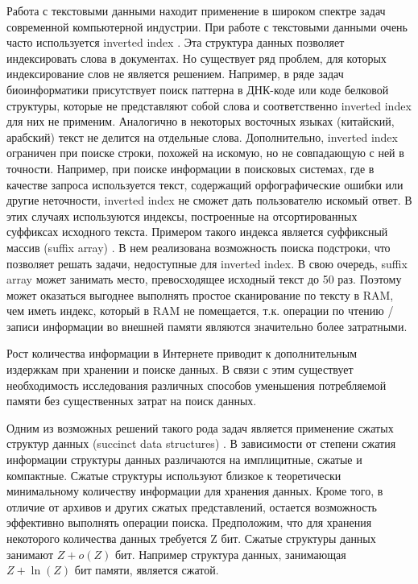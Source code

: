 

Работа с текстовыми данными находит применение в широком спектре задач современной компьютерной индустрии.
При работе с текстовыми данными очень часто используется inverted index \cite{zobel2006inverted}. Эта структура данных
позволяет индексировать слова в документах. Но существует ряд проблем, для которых индексирование слов
не является решением.
Например, в ряде задач биоинформатики \cite{tsuruoka2008facta} присутствует поиск паттерна
в ДНК-коде или коде белковой структуры,
которые не представляют собой слова и соответственно inverted index для них не применим.
Аналогично в некоторых восточных языках (китайский, арабский) текст не делится на отдельные слова.
Дополнительно, inverted index ограничен при поиске строки, похожей на искомую, но не совпадающую с ней в точности.
Например, при поиске информации в поисковых системах, где в качестве запроса используется текст, содержащий
орфографические ошибки или другие неточности, inverted index не сможет дать пользователю искомый ответ.
В этих случаях используются индексы, построенные на отсортированных суффиксах исходного текста.
Примером такого индекса является суффиксный массив (suffix array) \cite{manber1993suffix}.
В нем реализована возможность поиска подстроки,
что позволяет решать задачи, недоступные для inverted index. В свою очередь, suffix array может занимать
место, превосходящее исходный текст до 50 раз.
Поэтому может оказаться выгоднее выполнять простое сканирование по тексту в RAM,
чем иметь индекс, который в RAM не помещается, т.к. операции по чтению / записи информации во внешней памяти
являются значительно более затратными.

Рост количества информации в Интернете приводит к дополнительным издержкам при хранении и поиске данных.
В связи с этим существует необходимость исследования различных способов уменьшения потребляемой памяти без
существенных затрат на поиск данных.

Одним из возможных решений такого рода задач является применение сжатых структур данных
(succinct data structures) \cite{jacobson1988succinct}.
В зависимости от степени сжатия информации структуры данных различаются на имплицитные, сжатые и компактные.
Сжатые структуры используют близкое к теоретически минимальному количеству информации для хранения данных.
Кроме того, в отличие от архивов и других сжатых представлений, остается возможность
эффективно выполнять операции поиска.
Предположим, что для хранения некоторого количества данных требуется Z бит.
Сжатые структуры данных занимают \(Z + o(Z)\) бит. Например структура данных, занимающая \(Z + \ln(Z)\) бит памяти,
является сжатой.

